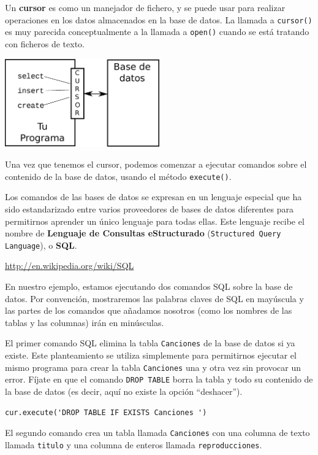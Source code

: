 Un {\bf cursor} es como un manejador de fichero, y se puede usar para realizar
operaciones en los datos almacenados en la base de datos. La llamada a
{\tt cursor()} es muy parecida conceptualmente a la llamada a
{\tt open()} cuando se está tratando con ficheros de texto.

\beforefig
\centerline{\includegraphics[height=1.50in]{figs2/cursor.eps}}
\afterfig

Una vez que tenemos el cursor, podemos comenzar a ejecutar
comandos sobre el contenido de la base de datos, usando el método
{\tt execute()}.

Los comandos de las bases de datos se expresan en un lenguaje especial que ha
sido estandarizado entre varios proveedores de bases de datos diferentes
para permitirnos aprender un único lenguaje para todas ellas. Este lenguaje
recibe el nombre de {\bf Lenguaje de Consultas eStructurado}
({\tt Structured Query Language}), o {\bf SQL}.

\url{http://en.wikipedia.org/wiki/SQL}

En nuestro ejemplo, estamos ejecutando dos comandos SQL sobre la base de datos.
Por convención, mostraremos las palabras claves de SQL en mayúscula
y las partes de los comandos que añadamos nosotros (como los nombres
de las tablas y las columnas) irán en minúsculas.

El primer comando SQL elimina la tabla {\tt Canciones} de la
base de datos si ya existe. Este planteamiento se utiliza simplemente para permitirnos
ejecutar el mismo programa para crear la tabla {\tt Canciones} una y
otra vez sin provocar un error. Fíjate en que el comando
{\tt DROP TABLE} borra la tabla y todo su contenido
de la base de datos (es decir, aquí no existe la opción ``deshacer'').

\beforeverb
\begin{verbatim}
cur.execute('DROP TABLE IF EXISTS Canciones ')
\end{verbatim}
\afterverb
%
El segundo comando crea un tabla llamada
{\tt Canciones} con una columna de texto llamada {\tt titulo}
y una columna de enteros llamada {\tt reproducciones}.

